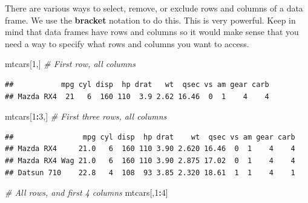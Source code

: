 \documentclass[]{book}
\newenvironment{Shaded}{\begin{snugshade}}{\end{snugshade}}
\newcommand{\DecValTok}[1]{\textcolor[rgb]{0.00,0.00,0.81}{#1}}
\newcommand{\CommentTok}[1]{\textcolor[rgb]{0.56,0.35,0.01}{\textit{#1}}}
\newcommand{\OperatorTok}[1]{\textcolor[rgb]{0.81,0.36,0.00}{\textbf{#1}}}
\newcommand{\NormalTok}[1]{#1}
\begin{document}
There are various ways to select, remove, or exclude rows and columns of
a data frame. We use the \textbf{bracket} notation to do this. This is
very powerful. Keep in mind that data frames have rows and columns so it
would make sense that you need a way to specify what rows and columns
you want to access.

\begin{Shaded}
\begin{Highlighting}[]
\NormalTok{mtcars[}\DecValTok{1}\NormalTok{,]     }\CommentTok{# First row, all columns}
\end{Highlighting}
\end{Shaded}

\begin{verbatim}
##           mpg cyl disp  hp drat   wt  qsec vs am gear carb
## Mazda RX4  21   6  160 110  3.9 2.62 16.46  0  1    4    4
\end{verbatim}

\begin{Shaded}
\begin{Highlighting}[]
\NormalTok{mtcars[}\DecValTok{1}\OperatorTok{:}\DecValTok{3}\NormalTok{,]   }\CommentTok{# First three rows, all columns}
\end{Highlighting}
\end{Shaded}

\begin{verbatim}
##                mpg cyl disp  hp drat    wt  qsec vs am gear carb
## Mazda RX4     21.0   6  160 110 3.90 2.620 16.46  0  1    4    4
## Mazda RX4 Wag 21.0   6  160 110 3.90 2.875 17.02  0  1    4    4
## Datsun 710    22.8   4  108  93 3.85 2.320 18.61  1  1    4    1
\end{verbatim}

\begin{Shaded}
\begin{Highlighting}[]
\CommentTok{# All rows, and first 4 columns}
\NormalTok{mtcars[,}\DecValTok{1}\OperatorTok{:}\DecValTok{4}\NormalTok{]   }
\end{Highlighting}
\end{Shaded}
\end{document}

